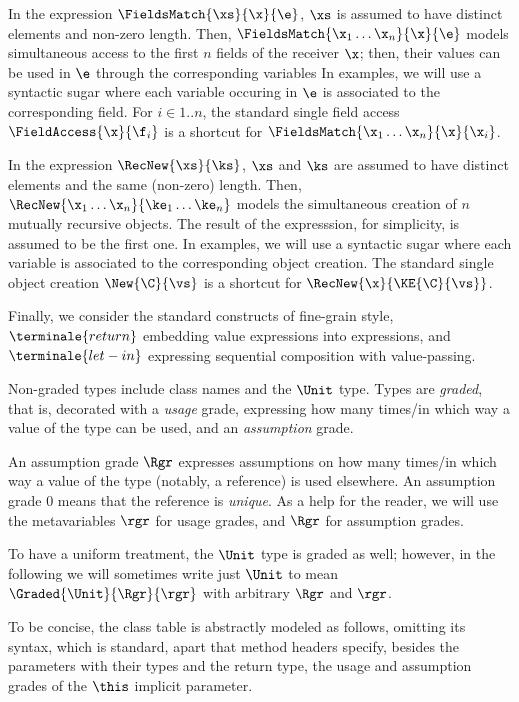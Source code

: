 In the expression $\FieldsMatch{\xs}{\x}{\e}$, $\xs$ is assumed to have distinct elements and non-zero length. Then, $\FieldsMatch{\x_1\ldots\x_n}{\x}{\e}$ models simultaneous access to the first $n$ fields of the receiver $\x$; then, their values can be used in $\e$ through the corresponding variables In examples, we will use a syntactic sugar where each variable occuring in $\e$ is associated to the corresponding field. For $i\in 1..n$, the standard single field access $\FieldAccess{\x}{\f_i}$ is a shortcut for
$\FieldsMatch{\x_1\ldots\x_n}{\x}{\x_i}$. 

In the expression $\RecNew{\xs}{\ks}$, $\xs$ and $\ks$ are assumed to have distinct elements and the same (non-zero) length. Then, $\RecNew{\x_1\ldots\x_n}{\ke_1\ldots\ke_n}$ models the simultaneous creation of $n$ mutually recursive objects. The result of the expresssion, for simplicity, is assumed to be the first one. In examples, we will use a syntactic sugar where each variable is associated to the corresponding object creation.
The standard single object creation $\New{\C}{\vs}$ is a shortcut for $\RecNew{\x}{\KE{\C}{\vs}}$.
\eez

Finally, we consider the standard constructs of fine-grain style, $\terminale{return}$ embedding value expressions into expressions, and $\terminale{let-in}$ expressing sequential composition with value-passing. 

Non-graded types include class names and the $\Unit$ type. Types are \emph{graded}, that is, decorated with a \emph{usage} grade, expressing how many times/in which way a value of the type can be used, and an \emph{assumption} grade. 

An assumption grade $\Rgr$ expresses assumptions on how many times/in which way a value of the type (notably, a reference) is used elsewhere. 
An assumption grade $0$ means that the reference is \emph{unique}.
As a help for the reader, we will use the metavariables $\rgr$ for usage grades, and $\Rgr$ for assumption grades. 

 To have a uniform treatment, the $\Unit$ type is graded as well; however, in the following we will sometimes write just $\Unit$ to mean $\Graded{\Unit}{\Rgr}{\rgr}$ with arbitrary $\Rgr$ and $\rgr$.

To be concise, the class table is abstractly modeled as follows, omitting its syntax, which is standard, apart that method headers specify, besides the parameters with their types and the return type, the usage and assumption grades of the $\this$ implicit parameter.  

